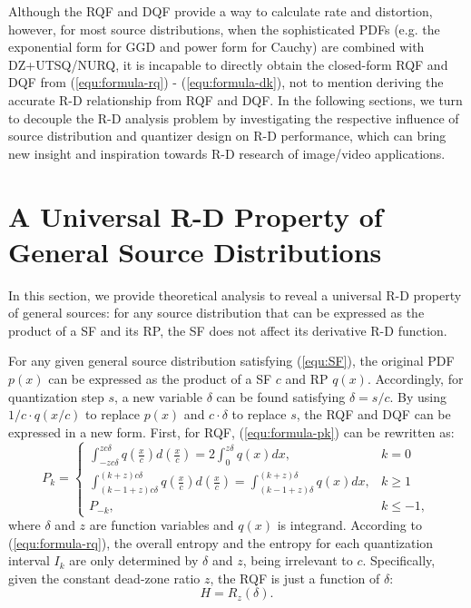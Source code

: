 \documentclass[smallabstract,smallcaptions]{dccpaper}
\begin{document}
Although the RQF and DQF provide a way to calculate rate and distortion, however, for most source distributions, when the sophisticated PDFs (e.g. the exponential form for GGD and power form for Cauchy) are combined with DZ+UTSQ/NURQ, it is incapable to directly obtain the closed-form RQF and DQF from (\ref{equ:formula-rq}) - (\ref{equ:formula-dk}), not to mention deriving the accurate R-D relationship from RQF and DQF. In the following sections, we turn to decouple the R-D analysis problem by investigating the respective influence of source distribution and quantizer design on R-D performance, which can bring new insight and inspiration towards R-D research of image/video applications. 

\section{A Universal R-D Property of General Source Distributions}
In this section, we provide theoretical analysis to reveal a universal R-D property of general sources: for any source distribution that can be expressed as the product of a SF and its RP, the SF does not affect its derivative R-D function.

For any given general source distribution satisfying (\ref{equ:SF}), the original PDF $p(x)$ can be expressed as the product of a SF $c$ and RP $q(x)$. Accordingly, for quantization step $s$, a new variable $\delta$ can be found satisfying $\delta = s/c$. By using $1/c \cdot q(x/c)$ to replace $p(x)$ and $c \cdot \delta$ to replace $s$, the RQF and DQF can be expressed in a new form. First, for RQF, (\ref{equ:formula-pk}) can be rewritten as:
\begin{equation}\label{equ:formula-pknew}
	P_k =
	\begin{cases}
		\int_{-z c\delta}^{z c\delta} q\left(\frac{x}{c}\right) d\left(\frac{x}{c}\right)
		= 2 \int_{0}^{z \delta} q(x) dx,
		& k=0 \\
		\int_{(k-1+z) c\delta}^{(k+z) c\delta} q\left(\frac{x}{c}\right) d\left(\frac{x}{c}\right)
		=\int_{(k-1+z) \delta}^{(k+z) \delta} q(x) dx,
		& k \ge 1 \\
		P_{-k},
		& k \le -1 ,
	\end{cases}
\end{equation} 
where $\delta$ and $z$ are function variables and $q(x)$ is integrand. According to (\ref{equ:formula-rq}), the overall entropy and the entropy for each quantization interval $I_k$ are only determined by $\delta$ and $z$, being irrelevant to $c$. Specifically, given the constant dead-zone ratio $z$, the RQF is just a function of $\delta$: 
\begin{equation}\label{equ:formula-rqnew}
	H = R_z(\delta).
\end{equation}
\end{document}
